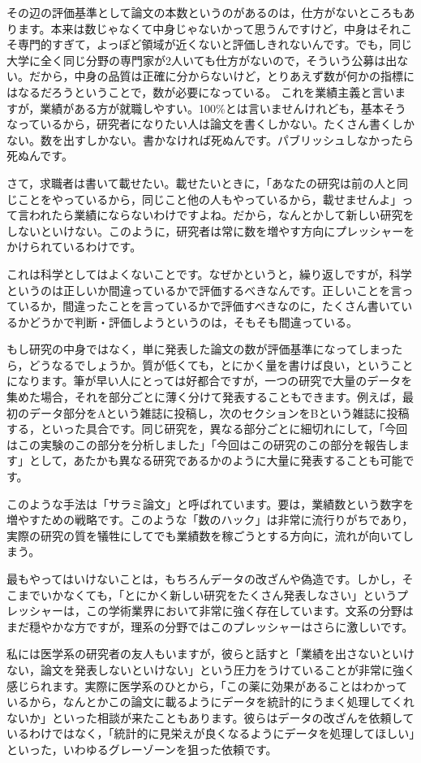 \documentclass{ltjsbook}
\begin{document}
その辺の評価基準として論文の本数というのがあるのは，仕方がないところもあります。本来は数じゃなくて中身じゃないかって思うんですけど，中身はそれこそ専門的すぎて，よっぽど領域が近くないと評価しきれないんです。でも，同じ大学に全く同じ分野の専門家が2人いても仕方がないので，そういう公募は出ない。だから，中身の品質は正確に分からないけど，とりあえず数が何かの指標にはなるだろうということで，数が必要になっている。
これを業績主義と言いますが，業績がある方が就職しやすい。100\%とは言いませんけれども，基本そうなっているから，研究者になりたい人は論文を書くしかない。たくさん書くしかない。数を出すしかない。書かなければ死ぬんです。パブリッシュしなかったら死ぬんです。

さて，求職者は書いて載せたい。載せたいときに，「あなたの研究は前の人と同じことをやっているから，同じこと他の人もやっているから，載せませんよ」って言われたら業績にならないわけですよね。だから，なんとかして新しい研究をしないといけない。このように，研究者は常に数を増やす方向にプレッシャーをかけられているわけです。

これは科学としてはよくないことです。なぜかというと，繰り返しですが，科学というのは正しいか間違っているかで評価するべきなんです。正しいことを言っているか，間違ったことを言っているかで評価すべきなのに，たくさん書いているかどうかで判断・評価しようというのは，そもそも間違っている。

もし研究の中身ではなく，単に発表した論文の数が評価基準になってしまったら，どうなるでしょうか。質が低くても，とにかく量を書けば良い，ということになります。筆が早い人にとっては好都合ですが，一つの研究で大量のデータを集めた場合，それを部分ごとに薄く分けて発表することもできます。例えば，最初のデータ部分をAという雑誌に投稿し，次のセクションをBという雑誌に投稿する，といった具合です。同じ研究を，異なる部分ごとに細切れにして，「今回はこの実験のこの部分を分析しました」「今回はこの研究のこの部分を報告します」として，あたかも異なる研究であるかのように大量に発表することも可能です。

このような手法は「サラミ論文」と呼ばれています。要は，業績数という数字を増やすための戦略です。このような「数のハック」は非常に流行りがちであり，実際の研究の質を犠牲にしてでも業績数を稼ごうとする方向に，流れが向いてしまう。

最もやってはいけないことは，もちろんデータの改ざんや偽造です。しかし，そこまでいかなくても，「とにかく新しい研究をたくさん発表しなさい」というプレッシャーは，この学術業界において非常に強く存在しています。文系の分野はまだ穏やかな方ですが，理系の分野ではこのプレッシャーはさらに激しいです。

私には医学系の研究者の友人もいますが，彼らと話すと「業績を出さないといけない，論文を発表しないといけない」という圧力をうけていることが非常に強く感じられます。実際に医学系のひとから，「この薬に効果があることはわかっているから，なんとかこの論文に載るようにデータを統計的にうまく処理してくれないか」といった相談が来たこともあります。彼らはデータの改ざんを依頼しているわけではなく，「統計的に見栄えが良くなるようにデータを処理してほしい」といった，いわゆるグレーゾーンを狙った依頼です。
\end{document}
